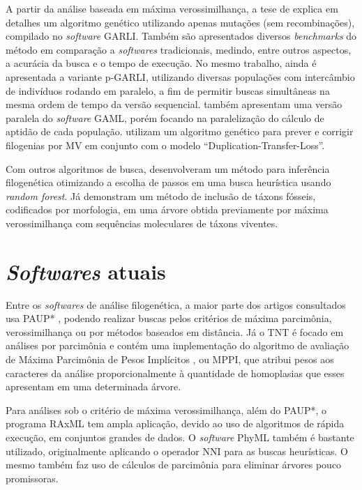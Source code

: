 \documentclass[12pt]{article}
\begin{document}
A partir da análise baseada em máxima verossimilhança, a tese de \cite{garli} explica em detalhes um algoritmo genético utilizando apenas mutações (sem recombinações), compilado no \emph{software} GARLI. Também são apresentados diversos \emph{benchmarks} do método em comparação a \emph{softwares} tradicionais, medindo, entre outros aspectos, a acurácia da busca e o tempo de execução. No mesmo trabalho, ainda é apresentada a variante p-GARLI, utilizando diversas populações com intercâmbio de indivíduos rodando em paralelo, a fim de permitir buscas simultâneas na mesma ordem de tempo da versão sequencial. \cite{parallel-gaml} também apresentam uma versão paralela do \emph{software} GAML, porém focando na paralelização do cálculo de aptidão de cada população. \cite{gatc} utilizam um algoritmo genético para prever e corrigir filogenias por MV em conjunto com o modelo ``Duplication-Transfer-Loss''.

Com outros algoritmos de busca, \cite{azouri2021harnessing} desenvolveram um método para inferência filogenética otimizando a escolha de passos em uma busca heurística usando \emph{random forest}. Já \cite{berger2010accuracy} demonstram um método de inclusão de táxons fósseis, codificados por morfologia, em uma árvore obtida previamente por máxima verossimilhança com sequências moleculares de táxons viventes.


\section{\emph{Softwares} atuais}

Entre os \emph{softwares} de análise filogenética, a maior parte dos artigos consultados usa PAUP* \cite{paup}, podendo realizar buscas pelos critérios de máxima parcimônia, verossimilhança ou por métodos baseados em distância. Já o TNT \cite{tnt} é focado em análises por parcimônia e contém uma implementação do algoritmo de avaliação de Máxima Parcimônia de Pesos Implícitos \cite{iwmp}, ou MPPI, que atribui pesos aos caracteres da análise proporcionalmente à quantidade de homoplasias que esses apresentam em uma determinada árvore.

Para análises sob o critério de máxima verossimilhança, além do PAUP*, o programa RAxML \cite{raxml} tem ampla aplicação, devido ao uso de algoritmos de rápida execução, em conjuntos grandes de dados. O \emph{software} PhyML \cite{phyml} também é bastante utilizado, originalmente aplicando o operador NNI para as buscas heurísticas. O mesmo também faz uso de cálculos de parcimônia para eliminar árvores pouco promissoras.
\end{document}
